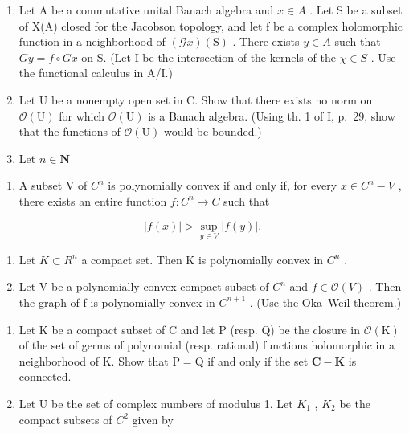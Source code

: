 \begin{enumerate}
\def\labelenumi{\arabic{enumi})}
\setcounter{enumi}{10}
\item
  Let A be a commutative unital Banach algebra and \(x \in A\) . Let S be a subset of X(A) closed for the Jacobson topology, and let f be a complex holomorphic function in a neighborhood of \((\mathcal{G}x)(\mathrm{S})\) . There exists \(y \in A\) such that \(Gy = f \circ Gx\) on S. (Let I be the intersection of the kernels of the \(\chi \in S\) . Use the functional calculus in A/I.)
\item
  Let U be a nonempty open set in C. Show that there exists no norm on \(\mathcal{O}(\mathrm{U})\) for which \(\mathcal{O}(\mathrm{U})\) is a Banach algebra. (Using th. 1 of I, p.~29, show that the functions of \(\mathcal{O}(\mathrm{U})\) would be bounded.)
\item
  Let \(n\in \mathbf{N}\)
\end{enumerate}

\begin{enumerate}
\def\labelenumi{\alph{enumi})}
\tightlist
\item
  A subset V of \(C^{n}\) is polynomially convex if and only if, for every \(x \in C^{n} - V\) , there exists an entire function \(f: C^{n} \to C\) such that
\end{enumerate}

\[
| f (x) | > \sup _ {y \in V} | f (y) |.
\]

\begin{enumerate}
\def\labelenumi{\alph{enumi})}
\setcounter{enumi}{1}
\item
  Let \(K \subset R^{n}\) a compact set. Then K is polynomially convex in \(C^{n}\) .
\item
  Let V be a polynomially convex compact subset of \(C^{n}\) and \(f \in \mathcal{O}(V)\) . Then the graph of f is polynomially convex in \(C^{n+1}\) . (Use the Oka--Weil theorem.)
\end{enumerate}

\begin{enumerate}
\def\labelenumi{\arabic{enumi})}
\setcounter{enumi}{13}
\item
  Let K be a compact subset of C and let P (resp. Q) be the closure in \(\mathcal{O}(\mathrm{K})\) of the set of germs of polynomial (resp. rational) functions holomorphic in a neighborhood of K. Show that \(\mathrm{P} = \mathrm{Q}\) if and only if the set \(\mathbf{C} - \mathbf{K}\) is connected.
\item
  Let U be the set of complex numbers of modulus 1. Let \(K_{1}\) , \(K_{2}\) be the compact subsets of \(C^{2}\) given by
\end{enumerate}

